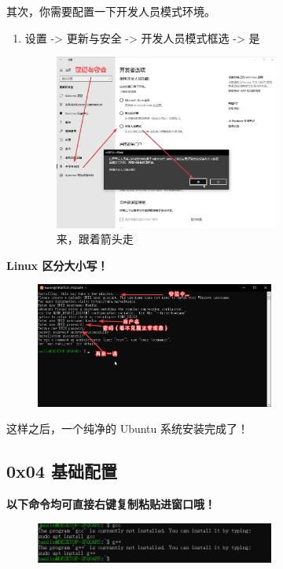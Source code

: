 其次，你需要配置一下开发人员模式环境。

\begin{enumerate}
\item 设置 -> 更新与安全 -> 开发人员模式框选 -> 是
\begin{figure}[htbp]
\centering
\includegraphics[width=0.7\textwidth]{docs/intro/images/WSL4.png} 
\caption{来，跟着箭头走}
\end{figure}     
\end{enumerate}



\textbf{Linux 区分大小写！}

\begin{figure}[htbp]
\centering
\includegraphics[width=0.7\textwidth]{docs/intro/images/WSL6.png} 

\end{figure}

 这样之后，一个纯净的 Ubuntu 系统安装完成了！

\subsection{0x04 基础配置}

 \textbf{ 以下命令均可直接右键复制粘贴进窗口哦！}

\begin{figure}[htbp]
\centering
\includegraphics[width=0.7\textwidth]{docs/intro/images/WSL7.png} 

\end{figure}


